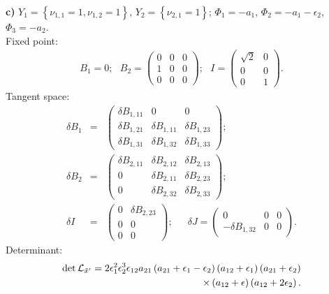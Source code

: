 \documentclass[a4paper,12pt]{article}
\begin{document}
{\bf c)} $Y_1=\left\{\nu_{1,1}=1, \nu_{1,2}=1 \right\}$,
$Y_2=\left\{\nu_{2,1}=1\right\}$; $\Phi_1=-a_1$,
$\Phi_2=-a_1-\epsilon_2$, $\Phi_3=-a_2$. \\
Fixed point:
\begin{eqnarray}
B_1=0; \, \, \, \, B_2=\left(\begin{array}{ccc} 0 & 0 & 0\\ 1 & 0 & 0 \\ 0 & 0 & 0
\end{array}\right);  \, \, \, \, I=\left(\begin{array}{cc} \sqrt{2} & 0 \\ 0 & 0 \\0 & 1
\end{array}\right).
\end{eqnarray}
Tangent space:
\begin{eqnarray}
\delta B_1 &=& \left(\begin{array}{ccc} \delta B_{1,11} & 0 & 0 \\
\delta B_{1,21}  & \delta B_{1,11} & \delta B_{1,23} \\ \delta
B_{1,31} & \delta B_{1,32} & \delta B_{1,33}
\end{array}\right); \nonumber \\
\delta B_2 &=&\left(\begin{array}{ccc} \delta B_{2,11} & \delta B_{2,12} & \delta B_{2,13} \\
0 & \delta B_{2,11} & \delta B_{2,23} \\
 0 & \delta B_{2,32} & \delta B_{2,33}
\end{array}\right); \nonumber \\
\delta I &=& \left(\begin{array}{cc} 0 & \delta B_{2,23} \\ 0 & 0
\\ 0 & 0
\end{array}\right); \, \, \, \, \, \, \, \, \,
\delta J=\left(\begin{array}{ccc} 0 & 0 & 0 \\ -\delta B_{1,32} &
0 & 0
\end{array}\right).
\end{eqnarray}
Determinant:
\begin{eqnarray}
\det {\cal L}_{{\tilde x}'}=2 \epsilon_1^2 \epsilon_2^3
\epsilon_{12} a_{21}
\left(a_{21}+\epsilon_1-\epsilon_2 \right)\left(a_{12}+\epsilon_1 \right) \left(a_{21}+\epsilon_2 \right)\nonumber \\
\times \left(a_{12}+\epsilon \right)\left(a_{12}+2 \epsilon_2 \right).
\end{eqnarray}
\end{document}
